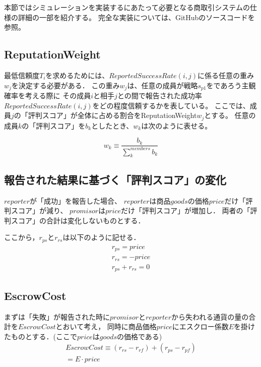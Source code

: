 本節ではシミュレーションを実装するにあたって必要となる商取引システムの仕様の詳細の一部を紹介する。
完全な実装については、GitHubのソースコードを参照。

\subsection{ReputationWeight}
最低信頼度$ T_i $を求めるためには、$ ReportedSuccessRate(i, j) $に係る任意の重み$ w_j $を決定する必要がある．
この重み$ w_j $は、任意の成員が戦略$s_{p1}$をであろう主観確率を考える際に
その成員$i$と相手$j$との間で報告された成功率$ ReportedSuccessRate(i, j) $をどの程度信頼するかを表している。
ここでは、成員$j$の「評判スコア」が全体に占める割合をReputationWeight$w_j$とする。
任意の成員$k$の「評判スコア」を$ b_{k} $としたとき、$w_k$は次のように表せる。

\begin{equation*}
  w_k \equiv \frac{b_k}{\sum^{members}_{k}b_k}
\end{equation*}

\subsection{報告された結果に基づく「評判スコア」の変化}
$ reporter $が「成功」を報告した場合、
$ reporter $は商品$ goods $の価格$ price $だけ「評判スコア」が減り、
$ promisor $は$ price $だけ「評判スコア」が増加し．
両者の「評判スコア」の合計は変化しないものとする．

ここから，$ r_{ps} $と$ r_{rs} $は以下のように記せる．\\

\begin{gather*}
  r_{ps} = price \\
  r_{rs} = -price \\
  r_{ps} + r_{rs} = 0
\end{gather*}


\subsection{EscrowCost}
まずは「失敗」が報告された時に$ promisor $と$ reporter $から失われる通貨の量の合計を$ EscrowCost $とおいて考え，
同時に商品価格$ price $にエスクロー係数$ E $を掛けたものとする．(ここで$ price $は$ goods $の価格である) \\

\begin{equation}
  \begin{split}
    EscrowCost \equiv (r_{rs} - r_{rf}) + (r_{ps} - r_{pf}) \\
    = E \cdot price
  \end{split}
\end{equation}

